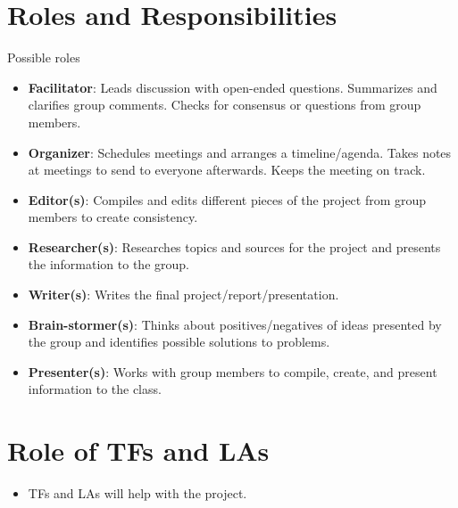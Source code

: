 \documentclass{article}
\begin{document}
\section*{Roles and Responsibilities}
Possible roles
\begin{itemize}
    \item \textbf{Facilitator}: Leads discussion with open-ended questions. Summarizes and clarifies group comments. Checks for consensus or questions from group members.
    \item \textbf{Organizer}: Schedules meetings and arranges a timeline/agenda. Takes notes at meetings to send to everyone afterwards. Keeps the meeting on track.
    \item \textbf{Editor(s)}: Compiles and edits different pieces of the project from group members to create consistency.
    \item \textbf{Researcher(s)}: Researches topics and sources for the project and presents the information to the group.
    \item \textbf{Writer(s)}: Writes the final project/report/presentation.
    \item \textbf{Brain-stormer(s)}: Thinks about positives/negatives of ideas presented by the group and identifies possible solutions to problems.
    \item \textbf{Presenter(s)}: Works with group members to compile, create, and present information to the class.
\end{itemize}



\section*{Role of TFs and LAs}
\begin{itemize}
    \item TFs and LAs will help with the project.
\end{itemize}
\end{document}
